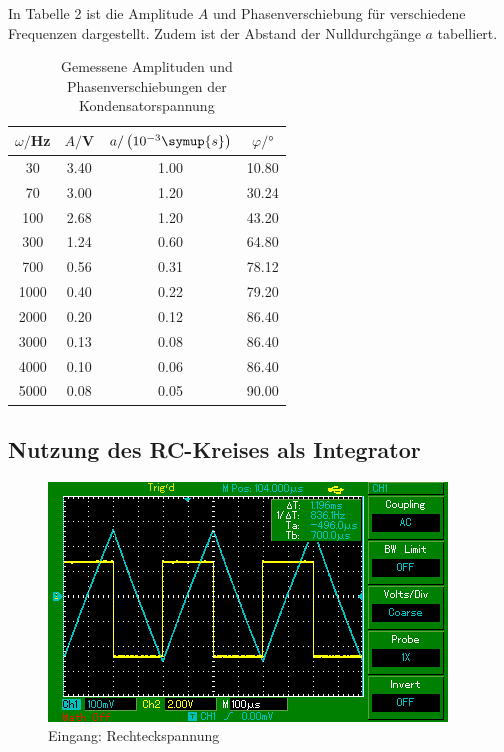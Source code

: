 In Tabelle 2 ist die Amplitude $A$ und Phasenverschiebung für verschiedene Frequenzen dargestellt. Zudem ist der
Abstand der Nulldurchgänge $a$ tabelliert.

\begin{table}[H]
  \centering
  \caption{Gemessene Amplituden und Phasenverschiebungen der Kondensatorspannung}
  \label{tab:amplitude}
  \begin{tabular}{c c c c}
    \toprule
    $\omega/$Hz & $A/$V & $a/\left(10^{-3}\symup{s}\right)$ & $\varphi /°$ \\
    \midrule
    30   &  3.40 &    1.00 &  10.80 \\
    70   &  3.00 &    1.20 &  30.24 \\
    100  &  2.68 &    1.20 &  43.20 \\
    300  &  1.24 &    0.60 &  64.80 \\
    700  &  0.56 &    0.31 &  78.12 \\
    1000 &  0.40 &    0.22 &  79.20 \\
    2000 &  0.20 &    0.12 &  86.40 \\
    3000 &  0.13 &    0.08 &  86.40 \\
    4000 &  0.10 &    0.06 &  86.40 \\
    5000 &  0.08 &    0.05 &  90.00 \\
    \bottomrule
  \end{tabular}
\end{table}

\subsection{Nutzung des RC-Kreises als Integrator}

\begin{figure}[H]
  \centering
  \includegraphics{MAP001.png}
  \caption{Eingang: Rechteckspannung}
  \label{fig:Rechteckspannung}
\end{figure}

